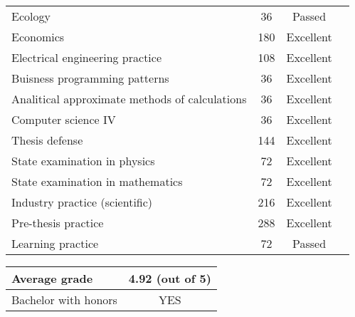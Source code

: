 \documentclass[11pt, a4paper]{report}
\begin{document}
\begin{tabular}{|p{6cm}|c|c|c|}
Ecology & 36  & Passed \\
Economics & 180  & Excellent \\
Electrical engineering practice & 108  & Excellent \\ 
\hline
Buisness programming patterns & 36  & Excellent \\
Analitical approximate methods of calculations & 36  & Excellent \\ 
Computer science IV & 36  & Excellent \\ 
\hline
Thesis defense & 144  & Excellent \\
\hline
State examination in physics & 72  & Excellent \\
State examination in mathematics & 72  & Excellent \\
\hline
Industry practice (scientific) & 216  & Excellent \\
Pre-thesis practice & 288  & Excellent \\
Learning practice & 72  & Passed \\
\hline
\end{tabular}
\newline
\vskip 2cm
\begin{tabular}{|l|c|}
\hline
Average grade & 4.92 (out of 5) \\
\hline
Bachelor with honors & YES\\
\hline
\end{tabular}
\end{document}
